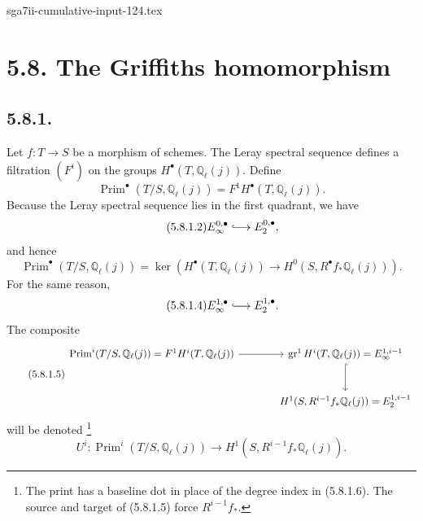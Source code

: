 \begin{filecontents*}{sga7ii-cumulative-input-124.tex}
\section*{5.8. The Griffiths homomorphism}

\subsection*{5.8.1.}
Let $f:T\to S$ be a morphism of schemes.  The Leray spectral sequence
defines a filtration $(F^i)$ on the groups
$H^\bullet(T,\mathbb Q_\ell(j))$.  Define
\begin{equation}\tag{5.8.1.1}
\operatorname{Prim}^\bullet(T/S,\mathbb Q_\ell(j))
=F^1H^\bullet(T,\mathbb Q_\ell(j)).
\end{equation}
Because the Leray spectral sequence lies in the first quadrant, we have
\begin{equation}\tag{5.8.1.2}
E_\infty^{0,\bullet}\lhook\joinrel\longrightarrow E_2^{0,\bullet},
\end{equation}
and hence
\begin{equation}\tag{5.8.1.3}
\operatorname{Prim}^\bullet(T/S,\mathbb Q_\ell(j))
=\ker\!\left(
H^\bullet(T,\mathbb Q_\ell(j))
\longrightarrow H^0(S,R^\bullet f_*\mathbb Q_\ell(j))
\right).
\end{equation}
For the same reason,
\begin{equation}\tag{5.8.1.4}
E_\infty^{1,\bullet}\lhook\joinrel\longrightarrow E_2^{1,\bullet}.
\end{equation}
The composite
\begin{equation}\tag{5.8.1.5}
\begin{tikzcd}[column sep=large,row sep=large]
\operatorname{Prim}^i(T/S,\mathbb Q_\ell(j))
=F^1H^i(T,\mathbb Q_\ell(j))
  \arrow[r]
&
\operatorname{gr}^1H^i(T,\mathbb Q_\ell(j))
=E_\infty^{1,i-1}
  \arrow[d,hook]
\\
{}
&
H^1(S,R^{i-1}f_*\mathbb Q_\ell(j))
=E_2^{1,i-1}
\end{tikzcd}
\end{equation}
will be denoted
\footnote{The print has a baseline dot in place of the degree index in
(5.8.1.6).  The source and target of (5.8.1.5) force $R^{i-1}f_*$.}
\begin{equation}\tag{5.8.1.6}
U^i:\operatorname{Prim}^i(T/S,\mathbb Q_\ell(j))
\longrightarrow H^1(S,R^{i-1}f_*\mathbb Q_\ell(j)).
\end{equation}


\end{filecontents*}
